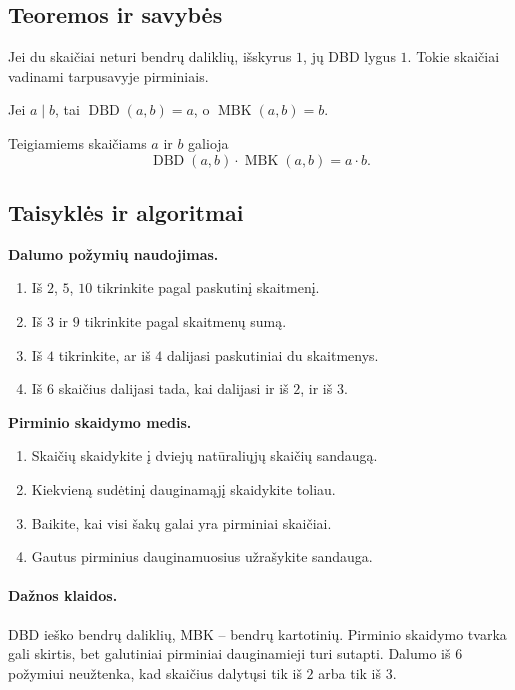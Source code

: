 \subsection{Teoremos ir savybės}
\begin{savybe}
Jei du skaičiai neturi bendrų daliklių, išskyrus \(1\), jų DBD lygus \(1\). Tokie skaičiai vadinami tarpusavyje pirminiais.
\end{savybe}
\begin{savybe}
Jei \(a\mid b\), tai \(\operatorname{DBD}(a,b)=a\), o \(\operatorname{MBK}(a,b)=b\).
\end{savybe}
\begin{savybe}
Teigiamiems skaičiams \(a\) ir \(b\) galioja
\[
\operatorname{DBD}(a,b)\cdot \operatorname{MBK}(a,b)=a\cdot b.
\]
\end{savybe}

\subsection{Taisyklės ir algoritmai}
\textbf{Dalumo požymių naudojimas.}
\begin{enumerate}[label=\arabic*.]
\item Iš \(2\), \(5\), \(10\) tikrinkite pagal paskutinį skaitmenį.
\item Iš \(3\) ir \(9\) tikrinkite pagal skaitmenų sumą.
\item Iš \(4\) tikrinkite, ar iš \(4\) dalijasi paskutiniai du skaitmenys.
\item Iš \(6\) skaičius dalijasi tada, kai dalijasi ir iš \(2\), ir iš \(3\).
\end{enumerate}

\textbf{Pirminio skaidymo medis.}
\begin{enumerate}[label=\arabic*.]
\item Skaičių skaidykite į dviejų natūraliųjų skaičių sandaugą.
\item Kiekvieną sudėtinį dauginamąjį skaidykite toliau.
\item Baikite, kai visi šakų galai yra pirminiai skaičiai.
\item Gautus pirminius dauginamuosius užrašykite sandauga.
\end{enumerate}

\paragraph{Dažnos klaidos.}
DBD ieško bendrų daliklių, MBK -- bendrų kartotinių. Pirminio skaidymo tvarka gali skirtis, bet galutiniai pirminiai dauginamieji turi sutapti. Dalumo iš \(6\) požymiui neužtenka, kad skaičius dalytųsi tik iš \(2\) arba tik iš \(3\).

